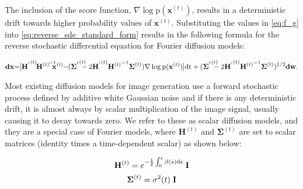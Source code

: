\documentclass[12pt,]{article}
\begin{document}
\noindent The inclusion of the score function, $\nabla \log{\text{p} (\mathbf{x}^{(t)})}$, results in a deterministic drift towards higher probability values of $\mathbf{x}^{(t)}$. Substituting the values in \eqref{eq:f_g} into \eqref{eq:reverse_sde_standard_form} results in the following formula for the reverse stochastic differential equation for Fourier diffusion models:

\begin{gather}
     \mathbf{dx} \hspace{-1mm} = \hspace{-1mm} [\mathbf{H^{'}}^{(t)} \hspace{-.5mm} {\mathbf{H}^{(t)}}^{\hspace{-.5mm}-1} \hspace{-2mm}\mathbf{x}^{(t)} \hspace{-1mm} - \hspace{-1mm}(\boldsymbol{\Sigma^{'}}^{(t)}  \hspace{-3mm} -  2 {\mathbf{H^{'}}^{(t)}} {\mathbf{H}^{(t)}}^{\hspace{0mm}-1}  \boldsymbol{\Sigma}^{(t)} )  \nabla \log{\text{p} (\mathbf{x}^{(t)})}] \text{dt} + (\boldsymbol{\Sigma^{'}}^{(t)}   \hspace{-3mm} -  2 {\mathbf{H^{'}}^{(t)}} {\mathbf{H}^{(t)}}^{\hspace{0mm}-1}  \boldsymbol{\Sigma}^{(t)} )^{1/2} \mathbf{dw} .
    \label{eq:reverse_SDE_unconditional}
\end{gather}


Most existing diffusion models for image generation use a forward stochastic process defined by additive white Gaussian noise and if there is any deterministic drift, it is almost always by scalar multiplication of the image signal, usually causing it to decay towards zero. We refer to these as scalar diffusion models, and they are a special case of Fourier models, where $\mathbf{H}^{(t)}$ and $\boldsymbol{\Sigma}^{(t)}$ are set to scalar matrices (identity times a time-dependent scalar) as shown below:

\begin{gather}
    \mathbf{H}^{(t)} = e^{- \frac{1}{2}\int_0^t \beta(s)\text{ds}}\hspace{1mm} \mathbf{I} \label{eq:scalar_drift}\\
    \boldsymbol{\Sigma}^{(t)} = \sigma^2(t) \hspace{1mm} \mathbf{I} \label{eq:scalar_drift}
\end{gather}
\end{document}
